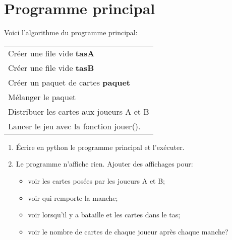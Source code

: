 \documentclass[11pt,a4paper]{article}
\begin{document}
\section{Programme principal}
Voici l'algorithme du programme principal:
\begin{center}
\begin{tabular}{|p{14cm}|}
\hline
Créer une file vide \textbf{tasA}\\
Créer une file vide \textbf{tasB}\\
Créer un paquet de cartes \textbf{paquet}\\
Mélanger le paquet\\
Distribuer les cartes aux joueurs A et B\\
Lancer le jeu avec la fonction jouer().\\
\hline
\end{tabular}
\end{center}

\begin{enumerate}
\item Écrire en python le programme principal et l'exécuter.
\item Le programme n'affiche rien. Ajouter des affichages pour:
\begin{itemize}
\item voir les cartes posées par les joueurs A et B;
\item voir qui remporte la manche;
\item voir lorsqu'il y a bataille et les cartes dans le tas;
\item voir le nombre de cartes de chaque joueur après chaque manche?
\end{itemize}

\end{enumerate}
\end{document}
